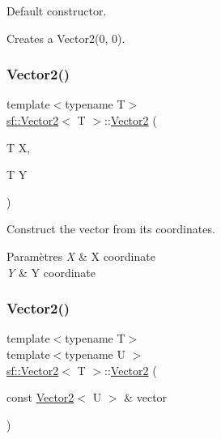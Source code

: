 Default constructor. 

Creates a Vector2(0, 0). \mbox{\label{classsf_1_1Vector2_aed26a72164e59e8a4a0aeee2049568f1}} 
\subsubsection{\texorpdfstring{Vector2()}{Vector2()}\hspace{0.1cm}{\footnotesize\ttfamily [2/3]}}
{\footnotesize\ttfamily template$<$typename T$>$ \\
\hyperlink{classsf_1_1Vector2}{sf\+::\+Vector2}$<$ T $>$\+::\hyperlink{classsf_1_1Vector2}{Vector2} (\begin{DoxyParamCaption}\item[{T}]{X,  }\item[{T}]{Y }\end{DoxyParamCaption})}



Construct the vector from its coordinates. 


\begin{DoxyParams}{Paramètres}
{\em X} & X coordinate \\
\hline
{\em Y} & Y coordinate \\
\hline
\end{DoxyParams}
\mbox{\label{classsf_1_1Vector2_a3da455e0ae3f8ff6d2fe36d10b332d10}} 
\subsubsection{\texorpdfstring{Vector2()}{Vector2()}\hspace{0.1cm}{\footnotesize\ttfamily [3/3]}}
{\footnotesize\ttfamily template$<$typename T$>$ \\
template$<$typename U $>$ \\
\hyperlink{classsf_1_1Vector2}{sf\+::\+Vector2}$<$ T $>$\+::\hyperlink{classsf_1_1Vector2}{Vector2} (\begin{DoxyParamCaption}\item[{const \hyperlink{classsf_1_1Vector2}{Vector2}$<$ U $>$ \&}]{vector }\end{DoxyParamCaption})\hspace{0.3cm}{\ttfamily [explicit]}}



